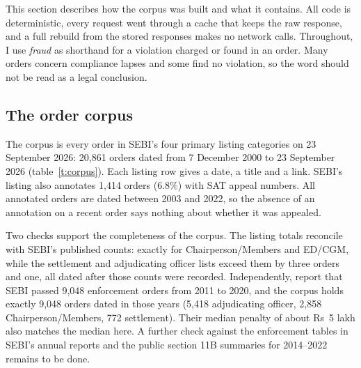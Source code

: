 \documentclass[letterpaper,11pt,leqno]{article}
\begin{document}
This section describes how the corpus was built and what it contains. All code is deterministic, every request went through a cache that keeps the raw response, and a full rebuild from the stored responses makes no network calls. Throughout, I use \emph{fraud} as shorthand for a violation charged or found in an order. Many orders concern compliance lapses and some find no violation, so the word should not be read as a legal conclusion.

\subsection{The order corpus}\label{s:corpus}

The corpus is every order in SEBI's four primary listing categories on 23 September 2026: 20,861 orders dated from 7 December 2000 to 23 September 2026 (table~\ref{t:corpus}). Each listing row gives a date, a title and a link. SEBI's listing also annotates 1,414 orders (6.8\%) with SAT appeal numbers. All annotated orders are dated between 2003 and 2022, so the absence of an annotation on a recent order says nothing about whether it was appealed.

\begin{table}[t]
\caption{The corpus by listing category}

\label{t:corpus}\end{table}

Two checks support the completeness of the corpus. The listing totals reconcile with SEBI's published counts: exactly for Chairperson/Members and ED/CGM, while the settlement and adjudicating officer lists exceed them by three orders and one, all dated after those counts were recorded. Independently, \citet{DZ22} report that SEBI passed 9,048 enforcement orders from 2011 to 2020, and the corpus holds exactly 9,048 orders dated in those years (5,418 adjudicating officer, 2,858 Chairperson/Members, 772 settlement). Their median penalty of about Rs~5 lakh also matches the median here. A further check against the enforcement tables in SEBI's annual reports \citep{SEBI26a} and the public section 11B summaries for 2014--2022 remains to be done.
\end{document}
